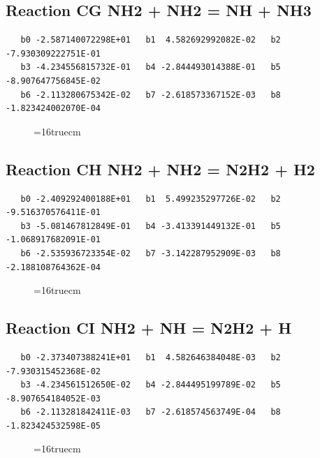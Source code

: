 \documentclass[12pt,dvipdfm]{article}
\begin{document}
\subsection{
Reaction CG NH2 + NH2 = NH + NH3 }
\begin{small}\begin{verbatim}
   b0 -2.587140072298E+01   b1  4.582692992082E-02   b2 -7.930309222751E-01
   b3 -4.234556815732E-01   b4 -2.844493014388E-01   b5 -8.907647756845E-02
   b6 -2.113280675342E-02   b7 -2.618573367152E-03   b8 -1.823424002070E-04
\end{verbatim}\end{small}
\begin{figure}[h!] \label{n2rates}
\epsfxsize=16truecm
\end{figure}
\newpage

\subsection{
Reaction CH NH2 + NH2 = N2H2 + H2 }
\begin{small}\begin{verbatim}
   b0 -2.409292400188E+01   b1  5.499235297726E-02   b2 -9.516370576411E-01
   b3 -5.081467812849E-01   b4 -3.413391449132E-01   b5 -1.068917682091E-01
   b6 -2.535936723354E-02   b7 -3.142287952909E-03   b8 -2.188108764362E-04
\end{verbatim}\end{small}
\begin{figure}[h!] \label{n2rates}
\epsfxsize=16truecm
\end{figure}
\newpage

\subsection{
Reaction CI NH2 + NH = N2H2 + H }
\begin{small}\begin{verbatim}
   b0 -2.373407388241E+01   b1  4.582646384048E-03   b2 -7.930315452368E-02
   b3 -4.234561512650E-02   b4 -2.844495199789E-02   b5 -8.907654184052E-03
   b6 -2.113281842411E-03   b7 -2.618574563749E-04   b8 -1.823424532598E-05
\end{verbatim}\end{small}
\begin{figure}[h!] \label{n2rates}
\epsfxsize=16truecm
\end{figure}
\newpage
\end{document}
